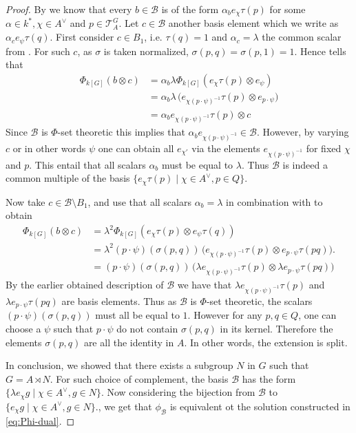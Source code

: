 \documentclass[a4paper,10pt]{amsart}
\theoremstyle{definition}
\theoremstyle{remark}
\newcommand\ot{\otimes}
\newcommand\mc{\mathcal}
\begin{document}
\begin{proof}
By  we know that every $b \in \mc{B}$ is of the form $\alpha_b e_{\chi}\tau(p)$ for some $\alpha \in k^*, \chi \in A^{\vee}$ and $p \in \mc{T}_{A}^G$. Let $c \in \mc{B}$ another basis element which we write as $\alpha_c e_{\psi} \tau(q).$ First consider $c \in B_1$, i.e. $\tau(q) = 1$ and $\alpha_c = \lambda$ the common scalar from . For such $c$, as $\sigma$ is taken normalized, $\sigma(p,q) = \sigma(p,1)= 1$. Hence  tells that 
\begin{align*}
\Phi_{k[G]}(b \ot c) &  = \alpha_b\lambda \Phi_{k[G]}(e_\chi \tau(p)\otimes e_\psi ) \\
& = \alpha_b\lambda  \,
\Big(e_{\chi(p\cdot\psi)^{-1}} \tau(p)\otimes e_{p\cdot\psi}\Big) \\
& = \alpha_b  e_{\chi(p\cdot\psi)^{-1}} \tau(p)\otimes c
\end{align*}
Since $\mc{B}$ is $\Phi$-set theoretic this implies that $\alpha_b  e_{\chi(p\cdot\psi)^{-1}} \in \mc{B}$. However, by varying $c$ or in other words $\psi$  one can obtain all $e_{\chi'}$ via the elements $e_{\chi (p \cdot\psi)^{-1}}$ for fixed $\chi$ and $p$. This entail that all scalars $\alpha_b$ must be equal to $\lambda.$ Thus $\mc{B}$ is indeed a common multiple of the basis $\{ e_{\chi} \tau(p) \mid \chi \in A^{\vee}, p \in Q\}$.

Now take $c \in \mc{B}\setminus B_1$, and use that all scalars $\alpha_b = \lambda$ in combination with  to obtain 
\begin{align*}
\Phi_{k[G]}(b \ot c) &  = \lambda^2 \Phi_{k[G]}(e_\chi \tau(p)\otimes e_\psi \tau(q)) \\
& = \lambda^2  (p \cdot \psi)(\sigma(p,q))\,
\Big(e_{\chi(p\cdot\psi)^{-1}} \tau(p)\otimes e_{p\cdot\psi}\tau(pq)\Big). \\
& = (p \cdot \psi)(\sigma(p,q))\,\Big(\lambda e_{\chi(p\cdot\psi)^{-1}} \tau(p)\otimes \lambda e_{p\cdot\psi}\tau(pq)\Big)
\end{align*}
By the earlier obtained description of $\mc{B}$ we have that $\lambda e_{\chi(p\cdot\psi)^{-1}} \tau(p)$ and $ \lambda e_{p\cdot\psi}\tau(pq)$ are basis elements. Thus as $\mc{B}$ is $\Phi$-set theoretic, the scalars $(p \cdot \psi)(\sigma(p,q))$ must all be equal to $1$. However for any $p,q \in Q$, one can choose a $\psi$ such that $p \cdot \psi$ do not contain $\sigma(p,q)$ in its kernel. Therefore the elements $\sigma(p,q)$ are all the identity in $A$. In other words, the extension is split.

In conclusion, we showed that there exists a subgroup $N$ in $G$ such that $G = A \rtimes N$. For such choice of complement, the basis $\mc{B}$ has the form $\{\lambda e_{\chi} g \mid \chi \in A^{\vee}, g \in N \}.$ Now considering the bijection from $\mc{B}$ to $\{e_{\chi} g \mid \chi \in A^{\vee}, g \in N \}.$, we get that $\phi_{\mc{B}}$ is equivalent ot the solution constructed in \eqref{eq:Phi-dual}.
\end{proof}




\end{document}
